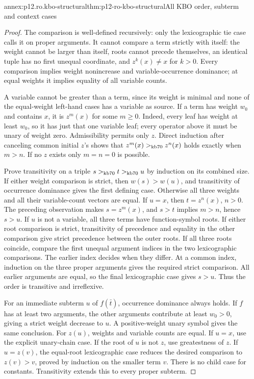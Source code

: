 \begin{annexitem}{annex:p12.ro.kbo-structural}{thm:p12-ro-kbo-structural}{All KBO order, subterm and context cases}
\begin{proof}
The comparison is well-defined recursively: only the lexicographic
tie case calls it on proper arguments. It cannot compare a term
strictly with itself: the weight cannot be larger than itself, roots
cannot precede themselves, an identical tuple has no first unequal
coordinate, and \(z^k(x)\ne x\) for \(k>0\).
Every comparison implies weight nonincrease and variable-occurrence
dominance; at equal weights it implies equality of all variable counts.

A variable cannot be greater than a term, since its weight is minimal
and none of the equal-weight left-hand cases has a variable as source.
If a term has weight \(w_0\) and contains \(x\), it is
\(z^m(x)\) for some \(m\geq0\). Indeed, every leaf has weight
at least \(w_0\), so it has just that one variable leaf; every
operator above it must be unary of weight zero. Admissibility permits
only \(z\). Direct induction after canceling common initial \(z\)'s
shows that \(z^m(x)>_{\rm kb70}z^n(x)\) holds exactly when
\(m>n\). If no \(z\) exists only \(m=n=0\) is possible.

Prove transitivity on a triple \(s>_{\rm kb70}t>_{\rm kb70}u\)
by induction on its combined size. If either weight comparison is
strict, then \(w(s)>w(u)\), and transitivity of occurrence dominance
gives the first defining case. Otherwise all three weights and all
their variable-count vectors are equal. If \(u=x\), then
\(t=z^n(x)\), \(n>0\). The preceding observation makes
\(s=z^m(x)\), and \(s>t\) implies \(m>n\), hence \(s>u\).
If \(u\) is not a variable, all three terms have function-symbol
roots. If either root comparison is strict, transitivity of precedence
and equality in the other comparison give strict precedence between
the outer roots. If all three roots coincide, compare the first
unequal argument indices in the two lexicographic comparisons. The
earlier index decides when they differ. At a common index, induction
on the three proper arguments gives the required strict comparison.
All earlier arguments are equal, so the final lexicographic case
gives \(s>u\). Thus the order is transitive and irreflexive.

For an immediate subterm \(u\) of \(f(\bar t)\), occurrence
dominance always holds. If \(f\) has at least two arguments, the
other arguments contribute at least \(w_0>0\), giving a strict
weight decrease to \(u\). A positive-weight unary symbol gives
the same conclusion. For \(z(u)\), weights and variable counts are
equal. If \(u=x\), use the explicit unary-chain case. If the root
of \(u\) is not \(z\), use greatestness of \(z\). If
\(u=z(v)\), the equal-root lexicographic case reduces the desired
comparison to \(z(v)>v\), proved by induction on the smaller term
\(v\). There is no child case for constants. Transitivity extends
this to every proper subterm.


\end{proof}
\end{annexitem}
